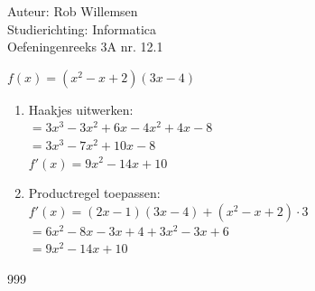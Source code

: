 \documentclass[a4paper]{article}
\begin{document}
\noindent \large Auteur: Rob Willemsen \\
\noindent \large Studierichting: Informatica\\
\noindent \large Oefeningenreeks 3A nr. 12.1\\

\medskip

\normalsize

$f(x) = \left(x^2 - x + 2\right) (3x - 4)$ \\

\begin{enumerate}
    \item Haakjes uitwerken: \\
    
    $= 3x^3 - 3x^2 + 6x - 4x^2 + 4x - 8$ \\

    $= 3x^3 - 7x^2 + 10x - 8$ \\

    $f'(x) = 9x^2 - 14x + 10$ \\
    
    \item Productregel toepassen: \\

    $f'(x) = \left(2x - 1\right) (3x - 4) + \left(x^2 - x + 2\right) \cdot 3$ \\

    $= 6x^2 - 8x - 3x + 4 + 3x^2 - 3x + 6$ \\

    $= 9x^2 - 14x + 10$ \\  
\end{enumerate}



\begin{thebibliography}{999}
\end{thebibliography}
\end{document}
